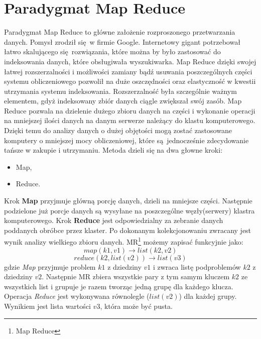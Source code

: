 \section{Paradygmat Map Reduce}
Paradygmat Map Reduce to główne założenie rozproszonego przetwarzania danych. Pomysł zrodził się w firmie Google. Internetowy gigant potrzebował łatwo skalującego się rozwiązania, które można by było zastosować do indeksowania danych, które obsługiwała wyszukiwarka. Map Reduce dzięki swojej łatwej rozszerzalności i możliwości zamiany bądź usuwania poszczególnych części systemu obliczeniowego pozwolił na duże oszczędności oraz elastyczność w kwestii utrzymania systemu indeksowania. Rozszerzalność była szczególnie ważnym elementem, gdyż indeksowany zbiór danych ciągle zwiększał swój zasób.
\newline
Map Reduce pozwala na dzielenie dużego zbioru danych na części i wykonanie operacji na mniejszej ilości danych na danym serwerze należący do klastu komputerowego. Dzięki temu do analizy danych o dużej objętości mogą zostać zastosowane komputery o mniejszej mocy obliczeniowej, które są jednocześnie zdecydowanie tańsze w zakupie i utrzymaniu. Metoda dzieli się na dwa głowne kroki:
\begin{itemize}
	\item Map,
	\item Reduce. 
\end{itemize}
Krok \textbf{Map} przyjmuje główną porcję danych, dzieli na mniejsze części. Następnie podzielone już porcje danych są wysyłane na poszczególne węzły(serwery) klastra komputerowego. Krok \textbf{Reduce} jest odpowiedzialny za zebranie danych poddanych obróbce przez klaster. Po dokonanym kolekcjonowaniu zwracany jest wynik analizy wielkiego zbioru danych\cite{map_reduce_description}.
\newline MR\footnote{Map Reduce} możemy zapisać funkcyjnie jako:
\begin{equation}
map(k1,v1) \to list(k2,v2)
\end{equation}
\begin{equation}
reduce(k2, list (v2)) \to list (v3)
\end{equation}
gdzie \textit{Map} przyjmuje problem $k1$ z dziedziny $v1$ i zwraca listę podproblemów $k2$ z dziedziny $v2$. Następnie MR zbiera wszystkie pary z tym samym kluczem $k2$ ze wszystkich list i grupuje je razem tworząc jedną grupę dla każdego klucza. Operacja \textit{Reduce} jest wykonywana równolegle ($list(v2)$) dla każdej grupy. Wynikiem jest lista wartości $v3$, która może być pusta\cite{map_reduce_microsoft_article}.

